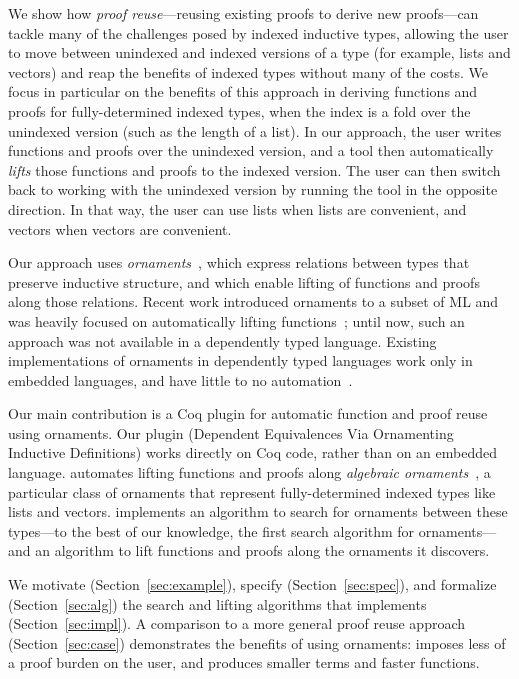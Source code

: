 We show how \textit{proof reuse}---reusing existing proofs to derive new proofs---can tackle many of the challenges posed
by indexed inductive types, allowing the user to move between unindexed and indexed versions of a type 
(for example, lists and vectors)
and reap the benefits of indexed types without many of the costs.
We focus in particular on the benefits of this approach in deriving functions and proofs for
fully-determined indexed types, when the index
is a fold over the unindexed version (such as the length of a list).
In our approach, the user writes functions and proofs over the unindexed version,
and a tool then automatically \textit{lifts} those functions and proofs to the indexed version.
The user can then switch back to working with the unindexed version by running the tool in the opposite direction.
In that way, the user can use lists when lists are convenient, and vectors when vectors are convenient.

Our approach uses \textit{ornaments}~\cite{mcbride}, which express relations between types that preserve
inductive structure, and which enable lifting of functions and proofs along those relations. 
Recent work introduced ornaments to a subset of ML and was heavily focused on automatically
lifting functions~\cite{Williams2017};
until now, such an approach was not available in a dependently typed language.
Existing implementations of ornaments in dependently typed languages work only in embedded languages,
and have little to no automation~\cite{ko2016programming, mcbride, dagand2014transporting}.

Our main contribution is a Coq plugin for automatic function and proof reuse
using ornaments. 
Our plugin \toolnameb (Dependent Equivalences Via Ornamenting Inductive Definitions) 
works directly on Coq code, rather than on an embedded language.
\toolnameb automates lifting functions and proofs along
\textit{algebraic ornaments}~\cite{mcbride}, a particular class of ornaments that represent fully-determined indexed types
like lists and vectors.
\toolnameb implements an algorithm to search for ornaments between these types---to the best of our knowledge, the first
search algorithm for ornaments---and an algorithm to lift functions and proofs along the ornaments it discovers.

We motivate (Section~\ref{sec:example}), specify (Section~\ref{sec:spec}), and formalize (Section~\ref{sec:alg}) 
the search and lifting algorithms that \toolnameb implements (Section~\ref{sec:impl}).
A comparison to a more general proof reuse approach (Section~\ref{sec:case}) demonstrates the benefits of using ornaments: \toolnameb
imposes less of a proof burden on the user, and produces smaller terms and faster functions.

